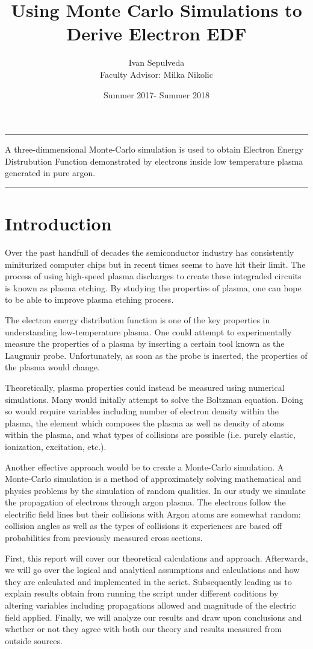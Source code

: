 \documentclass[12pt]{article}
\title{Using Monte Carlo Simulations to Derive Electron EDF\vspace{-2ex}}
\author{Ivan Sepulveda \\ Faculty Advisor: Milka Nikolic}
\date{\vspace{-1.5ex}Summer 2017-  Summer 2018\vspace{-2ex}}
\begin{document}
\maketitle
\hrule
\vspace{2ex}
A three-dimmensional Monte-Carlo simulation is used to obtain Electron Energy Distrubution Function demonstrated by electrons inside low temperature plasma generated in pure argon.
\vspace{1ex}
\hrule


\section{Introduction}

Over the past handfull of decades the semiconductor industry has consistently miniturized computer chips but in recent times seems to 
have hit their limit. The process of using high-speed plasma discharges to create these integraded circuits is known as plasma etching. 
By studying the properties of plasma, one can hope to be able to improve plasma etching process.

The electron energy distribution function is one of the key properties in understanding low-temperature plasma. One could attempt to 
experimentally measure the properties of a plasma by inserting a certain tool known as the Laugmuir probe. Unfortunately, as soon as 
the probe is inserted, the properties of the plasma would change. 

Theoretically, plasma properties could instead be measured using numerical simulations. Many would initally attempt to solve the 
Boltzman equation. Doing so would require variables including number of electron density within the plasma, the element which 
composes the plasma as well as density of atoms within the plasma, and what types of collisions are possible (i.e. purely elastic, 
ionization, excitation, etc.).

Another effective approach would be to create a Monte-Carlo simulation. A Monte-Carlo simulation is a method of approximately solving mathematical and physics problems by the simulation of random qualities. In our study we simulate the propagation of electrons through argon plasma. The electrons follow the electrific field lines but their collisions with Argon atoms are somewhat random: collision angles as well as the types of collisions it 
experiences are based off probabilities from previously measured cross sections.

First, this report will cover our theoretical calculations and approach. Afterwards, we will go over the logical and analytical assumptions 
and calculations and how they are calculated and implemented in the scrict. Subsequently leading us to explain results obtain from 
running the script under different coditions by altering variables including propagations allowed and magnitude of the electric field 
applied. Finally, we will analyze our results and draw upon conclusions and whether or not they agree with both our theory and results 
measured from outside sources.
\end{document}
